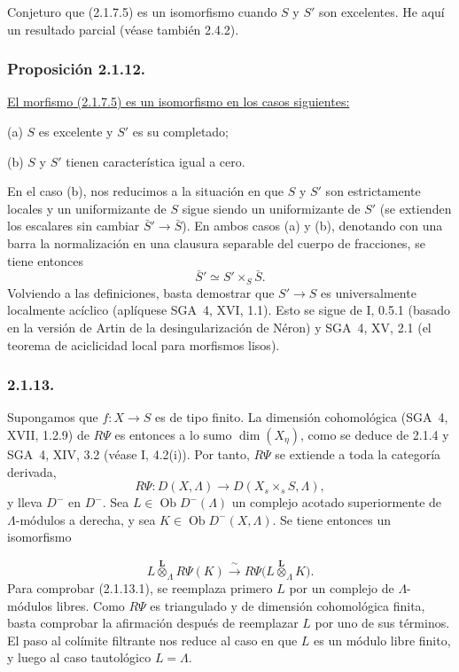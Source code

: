 Conjeturo que (2.1.7.5) es un isomorfismo cuando $S$ y $S'$ son excelentes.
He aquí un resultado parcial (véase también 2.4.2).

\subsubsection*{Proposición 2.1.12.}
\underline{El morfismo (2.1.7.5) es un isomorfismo en los casos siguientes:}

\medskip
\noindent(a) $S$ es excelente y $S'$ es su completado;

\noindent(b) $S$ y $S'$ tienen característica igual a cero.

En el caso (b), nos reducimos a la situación en que $S$ y $S'$ son
estrictamente locales y un uniformizante de $S$ sigue siendo un uniformizante
de $S'$ (se extienden los escalares sin cambiar
$\bar S'\longrightarrow\bar S$). En ambos casos (a) y (b), denotando con una
barra la normalización en una clausura separable del cuerpo de fracciones, se
tiene entonces
\[
\bar S'\simeq S'\times_S\bar S.
\]
Volviendo a las definiciones, basta demostrar que $S'\longrightarrow S$ es
universalmente localmente acíclico (aplíquese SGA~4, XVI, 1.1). Esto se sigue
de I, 0.5.1 (basado en la versión de Artin de la desingularización de Néron) y
SGA~4, XV, 2.1 (el teorema de aciclicidad local para morfismos lisos).

\subsubsection*{2.1.13.}
Supongamos que $f:X\longrightarrow S$ es de tipo finito. La dimensión
cohomológica (SGA~4, XVII, 1.2.9) de $R\Psi$ es entonces a lo sumo
$\dim(X_\eta)$, como se deduce de 2.1.4 y SGA~4, XIV, 3.2 (véase I, 4.2(i)).
Por tanto, $R\Psi$ se extiende a toda la categoría derivada,
\[
R\Psi:D(X,\Lambda)\longrightarrow D(X_s\times_sS,\Lambda),
\]
y lleva $D^-$ en $D^-$. Sea $L\in\operatorname{Ob}D^-(\Lambda)$ un complejo
acotado superiormente de $\Lambda$-módulos a derecha, y sea
$K\in\operatorname{Ob}D^-(X,\Lambda)$. Se tiene entonces un isomorfismo

\pageoriginale

\begin{equation}\tag{2.1.13.1}
L\overset{\mathbf L}{\otimes}_\Lambda R\Psi(K)
\xrightarrow{\ \sim\ }
R\Psi\bigl(L\overset{\mathbf L}{\otimes}_\Lambda K\bigr).
\end{equation}
Para comprobar (2.1.13.1), se reemplaza primero $L$ por un complejo de
$\Lambda$-módulos libres. Como $R\Psi$ es triangulado y de dimensión
cohomológica finita, basta comprobar la afirmación después de reemplazar $L$
por uno de sus términos. El paso al colímite filtrante nos reduce al caso en
que $L$ es un módulo libre finito, y luego al caso tautológico $L=\Lambda$.

